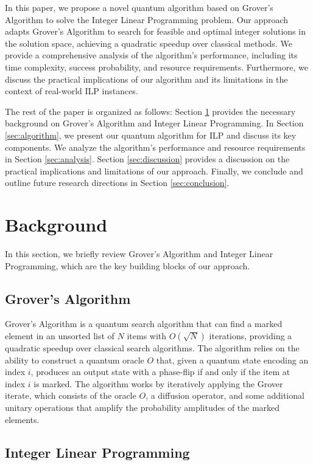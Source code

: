 In this paper, we propose a novel quantum algorithm based on Grover's Algorithm to solve the Integer Linear Programming problem. Our approach adapts Grover's Algorithm to search for feasible and optimal integer solutions in the solution space, achieving a quadratic speedup over classical methods. We provide a comprehensive analysis of the algorithm's performance, including its time complexity, success probability, and resource requirements. Furthermore, we discuss the practical implications of our algorithm and its limitations in the context of real-world ILP instances.

The rest of the paper is organized as follows: Section \ref{sec:background} provides the necessary background on Grover's Algorithm and Integer Linear Programming. In Section \ref{sec:algorithm}, we present our quantum algorithm for ILP and discuss its key components. We analyze the algorithm's performance and resource requirements in Section \ref{sec:analysis}. Section \ref{sec:discussion} provides a discussion on the practical implications and limitations of our approach. Finally, we conclude and outline future research directions in Section \ref{sec:conclusion}.

\section{Background} \label{sec:background}

In this section, we briefly review Grover's Algorithm and Integer Linear Programming, which are the key building blocks of our approach.

\subsection{Grover's Algorithm}

Grover's Algorithm \cite{grover1996fast} is a quantum search algorithm that can find a marked element in an unsorted list of $N$ items with $O(\sqrt{N})$ iterations, providing a quadratic speedup over classical search algorithms. The algorithm relies on the ability to construct a quantum oracle $O$ that, given a quantum state encoding an index $i$, produces an output state with a phase-flip if and only if the item at index $i$ is marked. The algorithm works by iteratively applying the Grover iterate, which consists of the oracle $O$, a diffusion operator, and some additional unitary operations that amplify the probability amplitudes of the marked elements.

\subsection{Integer Linear Programming}

